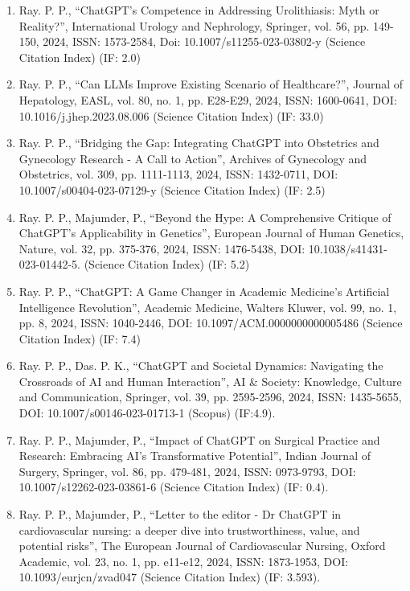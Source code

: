 \documentclass[11pt,a4paper]{moderncv}
\begin{document}
\begin{adjustwidth}{6em}{0pt}
\begin{enumerate}
		\item Ray. P. P., “ChatGPT’s Competence in Addressing Urolithiasis: Myth or Reality?”, International Urology and Nephrology, Springer, vol. 56, pp. 149-150, 2024, ISSN: 1573-2584, Doi: 10.1007/s11255-023-03802-y (Science Citation Index) (IF: 2.0)
		
		\item Ray. P. P., “Can LLMs Improve Existing Scenario of Healthcare?”, Journal of Hepatology, EASL, vol. 80, no. 1, pp. E28-E29, 2024, ISSN: 1600-0641, DOI: 10.1016/j.jhep.2023.08.006 (Science Citation Index) (IF: 33.0)
		
		\item Ray. P. P., “Bridging the Gap: Integrating ChatGPT into Obstetrics and Gynecology Research - A Call to Action”, Archives of Gynecology and Obstetrics, vol. 309, pp. 1111-1113, 2024, ISSN: 1432-0711, DOI: 10.1007/s00404-023-07129-y (Science Citation Index) (IF: 2.5)
		
		\item Ray. P. P., Majumder, P., “Beyond the Hype: A Comprehensive Critique of ChatGPT’s Applicability in Genetics”, European Journal of Human Genetics, Nature, vol. 32, pp. 375-376, 2024, ISSN: 1476-5438, DOI: 10.1038/s41431-023-01442-5. (Science Citation Index) (IF: 5.2)
		
		\item Ray. P. P., “ChatGPT: A Game Changer in Academic Medicine's Artificial Intelligence Revolution”, Academic Medicine, Walters Kluwer, vol. 99, no. 1, pp. 8, 2024, ISSN: 1040-2446, DOI: 10.1097/ACM.0000000000005486 (Science Citation Index) (IF: 7.4)
		
		\item Ray. P. P., Das. P. K., “ChatGPT and Societal Dynamics: Navigating the Crossroads of AI and Human Interaction”, AI \& Society: Knowledge, Culture and Communication, Springer, vol. 39, pp. 2595-2596, 2024, ISSN: 1435-5655, DOI: 10.1007/s00146-023-01713-1 (Scopus) (IF:4.9). 
		
		\item 	Ray. P. P., Majumder, P., “Impact of ChatGPT on Surgical Practice and Research: Embracing AI's Transformative Potential”, Indian Journal of Surgery, Springer, vol. 86, pp. 479-481, 2024, ISSN: 0973-9793, DOI: 10.1007/s12262-023-03861-6 (Science Citation Index) (IF: 0.4). 
		
		\item Ray. P. P., Majumder, P., “Letter to the editor - Dr ChatGPT in cardiovascular nursing: a deeper dive into trustworthiness, value, and potential risks”, The European Journal of Cardiovascular Nursing, Oxford Academic, vol. 23, no. 1, pp. e11-e12, 2024, ISSN: 1873-1953, DOI: 10.1093/eurjcn/zvad047 (Science Citation Index) (IF: 3.593). 
		

\end{enumerate}
\end{adjustwidth}
\end{document}
